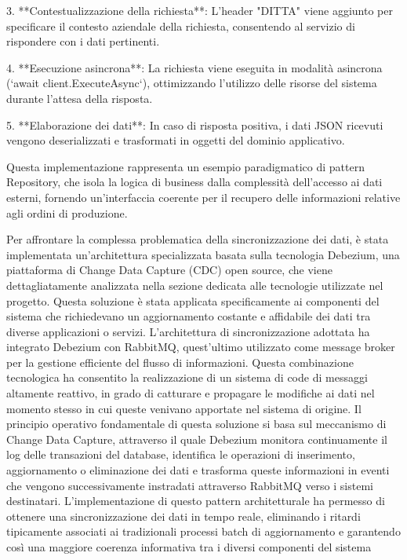3. **Contestualizzazione della richiesta**: L'header "DITTA" viene aggiunto per specificare il contesto aziendale della richiesta, consentendo al servizio di rispondere con i dati pertinenti.

4. **Esecuzione asincrona**: La richiesta viene eseguita in modalità asincrona (`await client.ExecuteAsync`), ottimizzando l'utilizzo delle risorse del sistema durante l'attesa della risposta.

5. **Elaborazione dei dati**: In caso di risposta positiva, i dati JSON ricevuti vengono deserializzati e trasformati in oggetti del dominio applicativo.

Questa implementazione rappresenta un esempio paradigmatico di pattern Repository, che isola la logica di business dalla complessità dell'accesso ai dati esterni, fornendo un'interfaccia coerente per il recupero delle informazioni relative agli ordini di produzione.

Per affrontare la complessa problematica della sincronizzazione dei dati, è stata implementata un'architettura specializzata basata sulla tecnologia Debezium, una piattaforma di Change Data Capture (CDC) open source, che viene dettagliatamente analizzata nella sezione dedicata alle tecnologie utilizzate nel progetto. Questa soluzione è stata applicata specificamente ai componenti del sistema che richiedevano un aggiornamento costante e affidabile dei dati tra diverse applicazioni o servizi.
L'architettura di sincronizzazione adottata ha integrato Debezium con RabbitMQ, quest'ultimo utilizzato come message broker per la gestione efficiente del flusso di informazioni. Questa combinazione tecnologica ha consentito la realizzazione di un sistema di code di messaggi altamente reattivo, in grado di catturare e propagare le modifiche ai dati nel momento stesso in cui queste venivano apportate nel sistema di origine.
Il principio operativo fondamentale di questa soluzione si basa sul meccanismo di Change Data Capture, attraverso il quale Debezium monitora continuamente il log delle transazioni del database, identifica le operazioni di inserimento, aggiornamento o eliminazione dei dati e trasforma queste informazioni in eventi che vengono successivamente instradati attraverso RabbitMQ verso i sistemi destinatari.
L'implementazione di questo pattern architetturale ha permesso di ottenere una sincronizzazione dei dati in tempo reale, eliminando i ritardi tipicamente associati ai tradizionali processi batch di aggiornamento e garantendo così una maggiore coerenza informativa tra i diversi componenti del sistema

